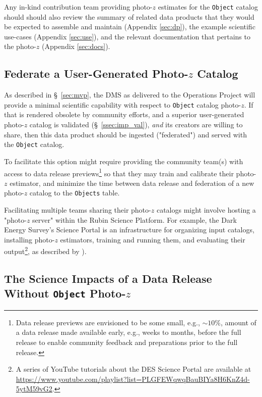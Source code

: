 \documentclass[DM,lsstdraft,toc]{lsstdoc}
\begin{document}
Any in-kind contribution team providing photo-$z$ estimates for the {\tt Object} catalog should should also review the summary of related data products that they would be expected to assemble and maintain (Appendix \ref{sec:dp}), the example scientific use-cases (Appendix \ref{sec:use}), and the relevant documentation that pertains to the photo-$z$ (Appendix \ref{sec:docs}).


\subsection{Federate a User-Generated Photo-$z$ Catalog}\label{ssec:opts_ugfed}

As described in \S~\ref{sec:mvp}, the DMS as delivered to the Operations Project will provide a minimal scientific capability with respect to {\tt Object} catalog photo-$z$.
If that is rendered obsolete by community efforts, and a superior user-generated photo-$z$ catalog is validated (\S~\ref{ssec:imp_val}), {\it and} its creators are willing to share, then this data product should be ingested ("federated") and served with the {\tt Object} catalog.

To facilitate this option might require providing the community team(s) with access to data release previews\footnote{Data release previews are envisioned to be some small, e.g., $\sim10\%$, amount of a data release made available early, e.g., weeks to months, before the full release to enable community feedback and preparations prior to the full release.} so that they may train and calibrate their photo-$z$ estimator, and minimize the time between data release and federation of a new photo-$z$ catalog to the {\tt Objects} table.

Facilitating multiple teams sharing their photo-$z$ catalogs might involve hosting a "photo-$z$ server" within the Rubin Science Platform.
For example, the Dark Energy Survey's Science Portal is an infrastructure for organizing input catalogs, installing photo-$z$ estimators, training and running them, and evaluating their output\footnote{A series of YouTube tutorials about the DES Science Portal are available at \url{https://www.youtube.com/playlist?list=PLGFEWqwqBauBIYa8H6KnZ4d-5ytM59vG2}.}, as described by \citet{2018A&C....25...58G}).


\subsection{The Science Impacts of a Data Release Without {\tt Object} Photo-$z$}\label{ssec:opts_none}
\end{document}
